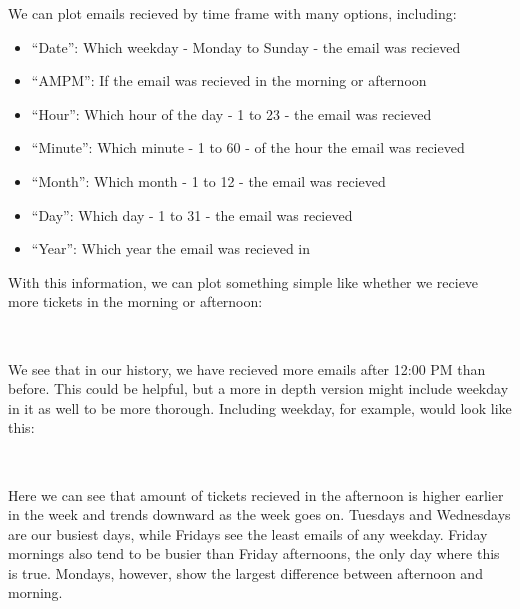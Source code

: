 \documentclass[11pt]{article}
\providecommand{\tightlist}{%
      \setlength{\itemsep}{0pt}\setlength{\parskip}{0pt}}
\begin{document}
We can plot emails recieved by time frame with many options, including:

\begin{itemize}
\tightlist
\item
  ``Date'': Which weekday - Monday to Sunday - the email was recieved 
\item
  ``AMPM'': If the email was recieved in the morning or afternoon 
\item
  ``Hour'': Which hour of the day - 1 to 23 - the email was recieved 
\item
  ``Minute'': Which minute - 1 to 60 - of the hour the email was
  recieved 
\item
  ``Month'': Which month - 1 to 12 - the email was recieved 
\item
  ``Day'': Which day - 1 to 31 - the email was recieved 
\item
  ``Year'': Which year the email was recieved in 
\end{itemize}

With this information, we can plot something simple like whether we
recieve more tickets in the morning or afternoon:

    \begin{center}
    \end{center}
    { \hspace*{\fill} \\}
    
    We see that in our history, we have recieved more emails after 12:00 PM
than before. This could be helpful, but a more in depth version might
include weekday in it as well to be more thorough. Including weekday,
for example, would look like this:

    \begin{center}
    \end{center}
    { \hspace*{\fill} \\}
    
    Here we can see that amount of tickets recieved in the afternoon is
higher earlier in the week and trends downward as the week goes on.
Tuesdays and Wednesdays are our busiest days, while Fridays see the
least emails of any weekday. Friday mornings also tend to be busier than
Friday afternoons, the only day where this is true. Mondays, however,
show the largest difference between afternoon and morning.
\end{document}
